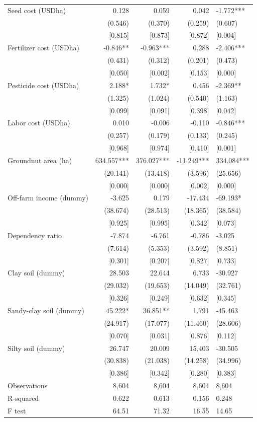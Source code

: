 \documentclass[
]{article}
\begin{document}
\begin{ThreePartTable}
\begin{longtable}[t]{lrrrl}
Seed cost (USD\/ha) & 0.128 & 0.059 & 0.042 & -1.772***\\
 & (0.546) & (0.370) & (0.259) & (0.607)\\
 & {}[0.815] & {}[0.873] & {}[0.872] & {}[0.004]\\
Fertilizer cost (USD\/ha) & -0.846** & -0.963*** & 0.288 & -2.406***\\
 & (0.431) & (0.312) & (0.201) & (0.473)\\
 & {}[0.050] & {}[0.002] & {}[0.153] & {}[0.000]\\
Pesticide cost (USD\/ha) & 2.188* & 1.732* & 0.456 & -2.369**\\
 & (1.325) & (1.024) & (0.540) & (1.163)\\
 & {}[0.099] & {}[0.091] & {}[0.398] & {}[0.042]\\
Labor cost (USD\/ha) & 0.010 & -0.006 & -0.110 & -0.846***\\
 & (0.257) & (0.179) & (0.133) & (0.245)\\
 & {}[0.968] & {}[0.974] & {}[0.410] & {}[0.001]\\
Groundnut area (ha) & 634.557*** & 376.027*** & -11.249*** & 334.084***\\
 & (20.141) & (13.418) & (3.596) & (25.656)\\
 & {}[0.000] & {}[0.000] & {}[0.002] & {}[0.000]\\
Off-farm income (dummy) & -3.625 & 0.179 & -17.434 & -69.193*\\
 & (38.674) & (28.513) & (18.365) & (38.584)\\
 & {}[0.925] & {}[0.995] & {}[0.342] & {}[0.073]\\
Dependency ratio & -7.874 & -6.761 & -0.786 & -3.025\\
 & (7.614) & (5.353) & (3.592) & (8.851)\\
 & {}[0.301] & {}[0.207] & {}[0.827] & {}[0.733]\\
Clay soil (dummy) & 28.503 & 22.644 & 6.733 & -30.927\\
 & (29.032) & (19.653) & (14.049) & (32.761)\\
 & {}[0.326] & {}[0.249] & {}[0.632] & {}[0.345]\\
Sandy-clay soil (dummy) & 45.222* & 36.851** & 1.791 & -45.463\\
 & (24.917) & (17.077) & (11.460) & (28.606)\\
 & {}[0.070] & {}[0.031] & {}[0.876] & {}[0.112]\\
Silty soil (dummy) & 26.747 & 20.009 & 15.403 & -30.505\\
 & (30.838) & (21.038) & (14.258) & (34.996)\\
 & {}[0.386] & {}[0.342] & {}[0.280] & {}[0.383]\\
Observations & 8,604 & 8,604 & 8,604 & 8,604\\
R-squared & 0.622 & 0.613 & 0.156 & 0.248\\
F test & 64.51 & 71.32 & 16.55 & 14.65\\*
\end{longtable}
\end{ThreePartTable}
\endgroup{}
\newpage
\end{document}
